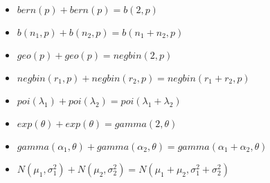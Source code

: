\documentclass[10pt, twocolumn]{article}
\begin{document}
\begin{itemize}
        \item $bern(p) + bern(p) = b(2,p)$
        \item $b(n_1,p) + b(n_2,p) = b(n_1 + n_2, p)$
        \item $geo(p) + geo(p) = negbin(2,p)$
        \item $negbin(r_1,p) + negbin(r_2,p) = negbin(r_1 + r_2, p)$
        \item $poi(\lambda_1) + poi(\lambda_2) = poi(\lambda_1 + \lambda_2)$
        \item $exp(\theta) + exp(\theta) = gamma(2,\theta)$
        \item $gamma(\alpha_1,\theta) + gamma(\alpha_2,\theta) = gamma(\alpha_1 + \alpha_2, \theta)$
        \item $N(\mu_1,\sigma_1^2) + N(\mu_2,\sigma_2^2) = N(\mu_1 + \mu_2,\sigma_1^2 + \sigma_2^2)$
\end{itemize}
\end{document}
